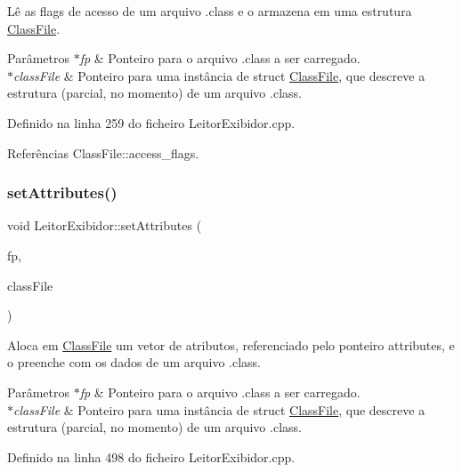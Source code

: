 Lê as flags de acesso de um arquivo .class e o armazena em uma estrutura \hyperlink{classClassFile}{Class\+File}. 
\begin{DoxyParams}{Parâmetros}
{\em $\ast$fp} & Ponteiro para o arquivo .class a ser carregado. \\
\hline
{\em $\ast$class\+File} & Ponteiro para uma instância de struct \hyperlink{classClassFile}{Class\+File}, que descreve a estrutura (parcial, no momento) de um arquivo .class. \\
\hline
\end{DoxyParams}


Definido na linha 259 do ficheiro Leitor\+Exibidor.\+cpp.



Referências Class\+File\+::access\+\_\+flags.

\mbox{\label{classLeitorExibidor_a988287e777377265b23482e307eb4a63}} 
\subsubsection{\texorpdfstring{set\+Attributes()}{setAttributes()}}
{\footnotesize\ttfamily void Leitor\+Exibidor\+::set\+Attributes (\begin{DoxyParamCaption}\item[{F\+I\+LE $\ast$}]{fp,  }\item[{\hyperlink{classClassFile}{Class\+File} $\ast$}]{class\+File }\end{DoxyParamCaption})\hspace{0.3cm}{\ttfamily [private]}}

Aloca em \hyperlink{classClassFile}{Class\+File} um vetor de atributos, referenciado pelo ponteiro attributes, e o preenche com os dados de um arquivo .class. 
\begin{DoxyParams}{Parâmetros}
{\em $\ast$fp} & Ponteiro para o arquivo .class a ser carregado. \\
\hline
{\em $\ast$class\+File} & Ponteiro para uma instância de struct \hyperlink{classClassFile}{Class\+File}, que descreve a estrutura (parcial, no momento) de um arquivo .class. \\
\hline
\end{DoxyParams}


Definido na linha 498 do ficheiro Leitor\+Exibidor.\+cpp.




